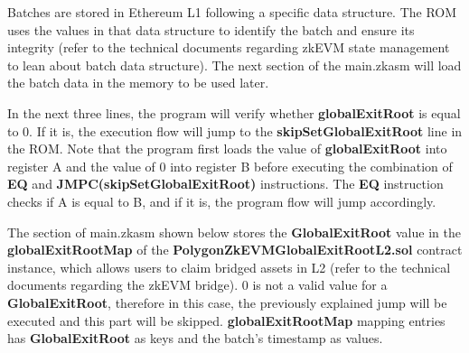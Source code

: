 Batches are stored in Ethereum L1 following a specific data structure. The ROM uses the values in that data structure to identify the batch and ensure its integrity (refer to the technical documents regarding zkEVM state management to lean about batch data structure). The next section of the main.zkasm will load the batch data in the memory to be used later.

In the next three lines, the program will verify whether \textbf{globalExitRoot} is equal to 0. If it is, the execution flow will jump to the \textbf{skipSetGlobalExitRoot} line in the ROM. Note that the program first loads the value of \textbf{globalExitRoot} into register A and the value of 0 into register B before executing the combination of \textbf{EQ} and \textbf{JMPC(skipSetGlobalExitRoot)} instructions. The \textbf{EQ} instruction checks if A is equal to B, and if it is, the program flow will jump accordingly.


The section of main.zkasm shown below stores the \textbf{GlobalExitRoot} value in the \textbf{globalExitRootMap} of the \textbf{PolygonZkEVMGlobalExitRootL2.sol} contract instance, which allows users to claim bridged assets in L2 (refer to the technical documents regarding the zkEVM bridge). 0 is not a valid value for a \textbf{GlobalExitRoot}, therefore in this case, the previously explained jump will be executed and this part will be skipped. \textbf{globalExitRootMap} mapping entries has \textbf{GlobalExitRoot} as keys and the batch's timestamp as values.


